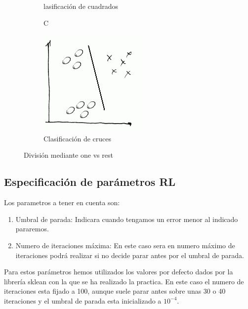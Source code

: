 \documentclass[12pt,a4paper]{article}
\begin{document}
\begin{figure}[H]
\begin{subfigure}[b]{0.3\textwidth}
				\caption[Clasificación de cuadrados]Clasificación de cuadrados{}	
		\end{subfigure}
	\begin{subfigure}[b]{0.3\textwidth}
		\label{f:conejo}
		\includegraphics[width=\textwidth]{../imagenesRL/screenshot005}
		\caption[Clasificación de cruces]{Clasificación de cruces}		
\end{subfigure}
	\caption[One vs Rest]{División mediante one vs rest}
\end{figure}

\subsection{Especificación de parámetros RL}
Los parametros a tener en cuenta son:
\begin{enumerate}		
	\item{Umbral de parada:} Indicara cuando tengamos un error menor al indicado pararemos.
	\item{Numero de iteraciones máxima:} En este caso sera en numero máximo de iteraciones podrá realizar si no decide parar antes por el umbral de parada.
\end{enumerate}
Para estos parámetros hemos utilizados los valores por defecto dados por la librería sklean con la que se ha realizado la practica. En este caso el numero de iteraciones esta fijado a 100, aunque suele parar antes sobre unas 30 o 40 iteraciones y el umbral de parada esta inicializado a $10^{-4}$.
\end{document}
